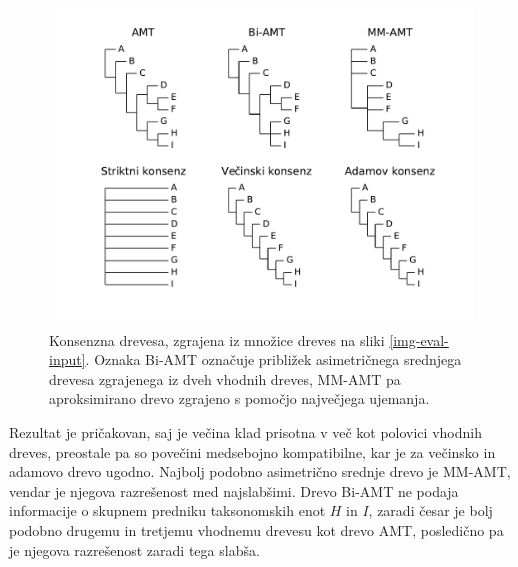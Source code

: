 \documentclass[a4paper, 12pt]{book}
\begin{document}
\begin{figure}[h!]
	\begin{center}
		\includegraphics[scale=0.55, clip=true, trim=1.5cm 1.5cm 1cm 0.8cm]{gfx/eval_gfx.pdf}
	\end{center}
	\caption{Konsenzna drevesa, zgrajena iz množice dreves na sliki \ref{img-eval-input}. Oznaka Bi-AMT označuje približek asimetričnega srednjega drevesa zgrajenega iz dveh vhodnih dreves, MM-AMT pa aproksimirano drevo zgrajeno s pomočjo največjega ujemanja.}
	\label{img-eval-result}
\end{figure}

Rezultat je pričakovan, saj je večina klad prisotna v več kot polovici vhodnih dreves, preostale pa so povečini medsebojno kompatibilne, kar je za večinsko in adamovo drevo ugodno. Najbolj podobno asimetrično srednje drevo je MM-AMT, vendar je njegova razrešenost med najslabšimi. Drevo Bi-AMT ne podaja informacije o skupnem predniku taksonomskih enot $H$ in $I$, zaradi česar je bolj podobno drugemu in tretjemu vhodnemu drevesu kot drevo AMT, posledično pa je njegova razrešenost zaradi tega slabša. 
\end{document}
